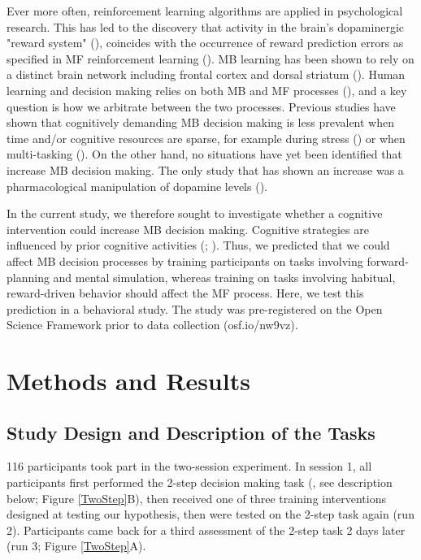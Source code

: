 \documentclass[11pt]{article} %
\begin{document}
Ever more often, reinforcement learning algorithms are applied in psychological research. This has led to the discovery that activity in the brain's dopaminergic "reward system" (\cite{wise_brain_1989}), coincides with the occurrence of reward prediction errors as specified in MF reinforcement learning (\cite{schultz_neural_1997}). MB learning has been shown to rely on a distinct brain network including frontal cortex and dorsal striatum (\cite{dolan_goals_2013}). Human learning and decision making relies on both MB and MF processes (\cite{daw_model-based_2011}), and a key question is how we arbitrate between the two processes. Previous studies have shown that cognitively demanding MB decision making is less prevalent when time and/or cognitive resources are sparse, for example during stress (\cite{schwabe_stress-induced_2011}) or when multi-tasking (\cite{otto_curse_2013}). On the other hand, no situations have yet been identified that increase MB decision making. The only study that has shown an increase was a pharmacological manipulation of dopamine levels (\cite{wunderlich_dopamine_2012}). 

In the current study, we therefore sought to investigate whether a cognitive intervention could increase MB decision making. Cognitive strategies are influenced by prior cognitive activities (\cite{jaeggi_short-_2011}; \cite{muraven_self-regulation_2000}). Thus, we predicted that we could affect MB decision processes by training participants on tasks involving forward-planning and mental simulation, whereas training on tasks involving habitual, reward-driven behavior should affect the MF process. Here, we test this prediction in a behavioral study. The study was pre-registered on the Open Science Framework prior to data collection (osf.io/nw9vz).

\section{Methods and Results}
\subsection{Study Design and Description of the Tasks}

116 participants took part in the two-session experiment. In session 1, all participants first performed the 2-step decision making task (\cite{daw_model-based_2011}, see description below; Figure \ref{TwoStep}B), then received one of three training interventions designed at testing our hypothesis, then were tested on the 2-step task again (run 2). Participants came back for a third assessment of the 2-step task 2 days later (run 3; Figure \ref{TwoStep}A).%
\end{document}
